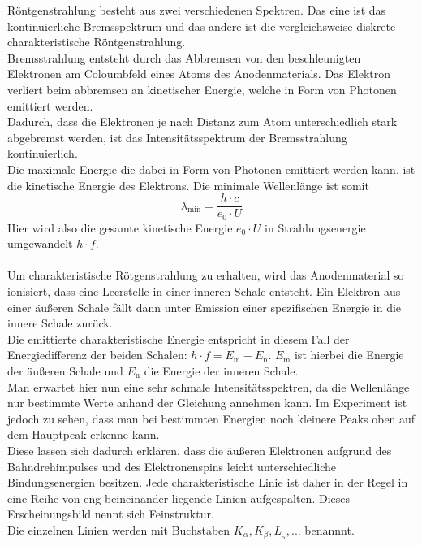 Röntgenstrahlung besteht aus zwei verschiedenen Spektren. Das 
eine ist das kontinuierliche Bremsspektrum und das andere ist die
vergleichsweise diskrete charakteristische Röntgenstrahlung.\\
Bremsstrahlung entsteht durch das Abbremsen von den beschleunigten
Elektronen am Coloumbfeld eines Atoms des Anodenmaterials. Das Elektron
verliert beim abbremsen an kinetischer Energie, welche in Form von Photonen
emittiert werden.\\
Dadurch, dass die Elektronen je nach Distanz zum Atom unterschiedlich stark
abgebremst werden, ist das Intensitätsspektrum der Bremsstrahlung
kontinuierlich.\\
Die maximale Energie die dabei in Form von Photonen emittiert werden kann, ist die
kinetische Energie des Elektrons. Die minimale Wellenlänge ist somit
\begin{equation}
    \label{eqn:Energiedifferenz}
    \lambda_{\mathrm{min}} = \frac{h\cdot c}{e_0 \cdot U}
\end{equation}
Hier wird also die gesamte kinetische Energie $e_0 \cdot U$ in Strahlungsenergie
umgewandelt $h \cdot f$.\\
\\
Um charakteristische Rötgenstrahlung zu erhalten, wird das Anodenmaterial so ionisiert,
dass eine Leerstelle in einer inneren Schale entsteht. Ein Elektron aus einer äußeren
Schale fällt dann unter Emission einer spezifischen Energie in die innere Schale zurück.\\
Die emittierte charakteristische Energie entspricht in diesem Fall der Energiedifferenz
der beiden Schalen: $h \cdot f = E_{\mathrm{m}} - E_{\mathrm{n}}$. $E_{\mathrm{m}}$ ist hierbei
die Energie der äußeren Schale und $E_{\mathrm{n}}$ die Energie der inneren Schale.\\
Man erwartet hier nun eine sehr schmale Intensitätsspektren, da die Wellenlänge nur bestimmte
Werte anhand der Gleichung annehmen kann. Im Experiment ist jedoch zu sehen, dass man
bei bestimmten Energien noch kleinere Peaks oben auf dem Hauptpeak erkenne kann.\\
Diese lassen sich dadurch erklären, dass die äußeren Elektronen aufgrund des Bahndrehimpulses
und des Elektronenspins leicht unterschiedliche Bindungsenergien besitzen. Jede charakteristische
Linie ist daher in der Regel in eine Reihe von eng beineinander liegende Linien aufgespalten.
Dieses Erscheinungsbild nennt sich Feinstruktur.\\
Die einzelnen Linien werden mit Buchstaben $K_{\alpha}, K_{\beta}, L__{\alpha},...$ benannnt. 
